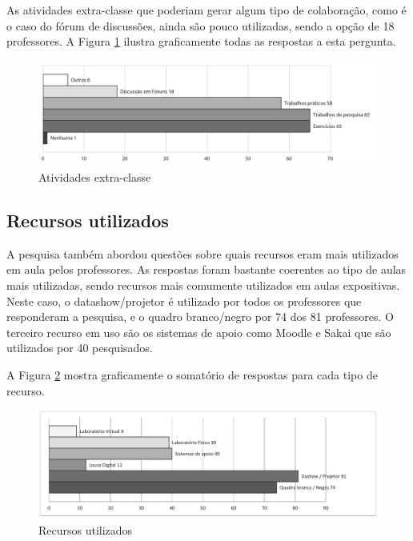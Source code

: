 As atividades extra-classe que poderiam gerar algum tipo de colaboração, como é o caso do fórum de discussões, ainda são pouco utilizadas, sendo a opção de 18 professores. A Figura \ref{fig:grafico_atividades_extra_classe} ilustra graficamente todas as respostas a esta pergunta.

 
\begin{figure}[!h]
\centering
\includegraphics[width=1.0\textwidth]{pdfs/professores/img-grafico-extra-classe.pdf} 
\caption{Atividades extra-classe}
\label{fig:grafico_atividades_extra_classe} 
\end{figure}


\subsection{Recursos utilizados}

A pesquisa também abordou questões sobre quais recursos eram mais utilizados em aula pelos professores. As respostas foram bastante coerentes ao tipo de aulas mais utilizadas, sendo recursos mais comumente utilizados em aulas expositivas. Neste caso, o datashow/projetor é utilizado por todos os professores que responderam a pesquisa, e o quadro branco/negro por 74 dos 81 professores. O terceiro recurso em uso são os sistemas de apoio como Moodle e Sakai que são utilizados por 40 pesquisados.

A Figura \ref{fig:grafico_recursos} mostra graficamente o somatório de respostas para cada tipo de recurso.
 
\begin{figure}[!h]
\centering
\includegraphics[width=1.0\textwidth]{pdfs/professores/img-grafico-recursos.pdf} 
\caption{Recursos utilizados}
\label{fig:grafico_recursos} 
\end{figure}

